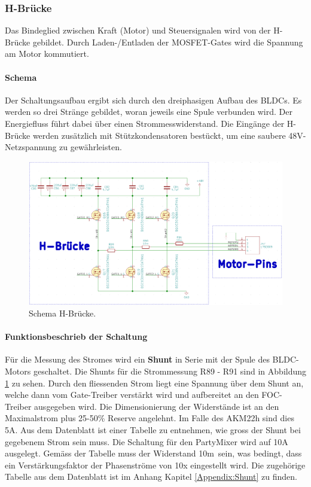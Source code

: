 \subsubsection{H-Brücke}
\label{subsubsec:H-Brücke}

Das Bindeglied zwischen Kraft (Motor) und Steuersignalen wird von der H-Brücke gebildet. Durch Laden-/Entladen der MOSFET-Gates wird die Spannung am Motor kommutiert.

\paragraph{Schema}\mbox{}

Der Schaltungsaufbau ergibt sich durch den dreiphasigen Aufbau des BLDCs. Es werden so drei Stränge gebildet, woran jeweils eine Spule verbunden wird. Der Energiefluss führt dabei über einen Strommesswiderstand. Die Eingänge der H-Brücke werden zusätzlich mit Stützkondensatoren bestückt, um eine saubere 48V-Netzspannung zu gewährleisten.

\begin{figure}[H]
	\centering
	\includegraphics[width=\textwidth]{graphics/Schema_H_Bruecke_und_BLDC}
	\caption{Schema H-Brücke.}
	\label{fig:Schema_H_Bruecke_und_BLDC}
\end{figure}

\paragraph{Funktionsbeschrieb der Schaltung}\mbox{}

Für die Messung des Stromes wird ein \textbf{Shunt} in Serie mit der Spule des BLDC-Motors geschaltet.
Die Shunts für die Strommessung R89 - R91 sind in Abbildung \ref{fig:Schema_H_Bruecke_und_BLDC} zu sehen. Durch den fliessenden Strom liegt eine Spannung über dem Shunt an, welche dann vom Gate-Treiber verstärkt wird und aufbereitet an den FOC-Treiber ausgegeben wird. Die Dimensionierung der Widerstände ist an den Maximalstrom plus 25-50\% Reserve angelehnt. Im Falle des AKM22h sind dies 5A. Aus dem Datenblatt ist einer Tabelle zu entnehmen, wie gross der Shunt bei gegebenem Strom sein muss. Die Schaltung für den PartyMixer wird auf 10A ausgelegt. Gemäss der Tabelle muss der Widerstand 10m\textOmega\ sein, was bedingt, dass ein Verstärkungsfaktor der Phasenströme von 10x eingestellt wird. Die zugehörige Tabelle aus dem Datenblatt ist im Anhang Kapitel \ref{Appendix:Shunt} zu finden. \cite[S.31]{trinamicmotion_control_gmbh__co_kg_tmc6200_2019}

